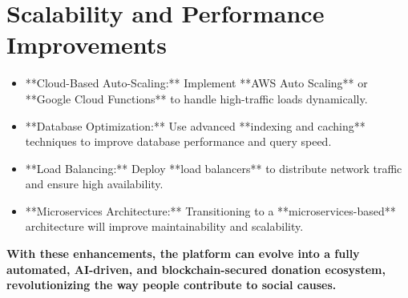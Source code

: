 \section{Scalability and Performance Improvements}
\begin{itemize}
    \item **Cloud-Based Auto-Scaling:** Implement **AWS Auto Scaling** or **Google Cloud Functions** to handle high-traffic loads dynamically.
    \item **Database Optimization:** Use advanced **indexing and caching** techniques to improve database performance and query speed.
    \item **Load Balancing:** Deploy **load balancers** to distribute network traffic and ensure high availability.
    \item **Microservices Architecture:** Transitioning to a **microservices-based** architecture will improve maintainability and scalability.
\end{itemize}

\textbf{With these enhancements, the platform can evolve into a fully automated, AI-driven, and blockchain-secured donation ecosystem, revolutionizing the way people contribute to social causes.}
